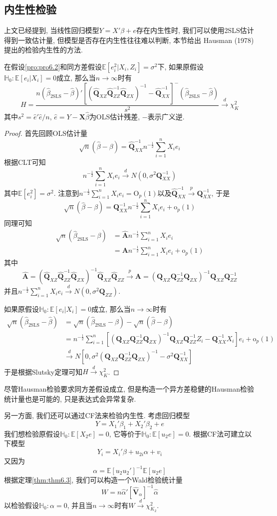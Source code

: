 \documentclass[cn, 12pt, math=mtpro2, bibstyle=apa, blue, twocol]{elegantbook}
\newcommand{\E}{\mathbb{E}}
\newcommand{\Q}{\mathbold{Q}}
\newcommand{\X}{\mathbold{X}}
\newcommand{\hb}{\hat{\beta}}
\newcommand{\HH}{\mathbb{H}}
\newcommand{\V}{\mathbold{V}}
\newcommand{\A}{\mathbold{A}}
\begin{document}
\subsection{内生性检验}
上文已经提到, 当线性回归模型$Y=X'\beta+e$存在内生性时, 我们可以使用2SLS估计得到一致估计量, 但模型是否存在内生性往往难以判断, 本节给出 Hausman (1978)提出的检验内生性的方法.
\begin{theorem}\label{thm:thm6.5}
  在假设\ref{pro:pro6.2}和同方差假设$\E[e_i^2|X_i,Z_i]=\sigma^2$下, 如果原假设$\HH_0: \E[e_i|X_i]=0$成立, 那么当$n\to\infty$时有
  $$H=\frac{n(\hb_{\text{2SLS}}-\hb)'[(\hat{\Q}_{XZ}\hat{\Q}_{ZZ}^{-1}\hat{\Q}_{ZX})^{-1}-\hat{\Q}_{XX}^{-1}]^{-}(\hb_{\text{2SLS}}-\hb)}{s^2}\xrightarrow{d}\chi^2_K$$
  其中$s^2=\hat{e}'\hat{e}/n$, $\hat{e}=Y-\X\hb$为OLS估计残差, $-$表示广义逆.
\end{theorem}
\begin{proof}
  首先回顾OLS估计量
  $$\sqrt{n}(\hb-\beta)=\hat{\Q}_{XX}^{-1}n^{-\frac{1}{2}}\sum_{i=1}^{n}X_ie_i$$
  根据CLT可知
  $$n^{-\frac{1}{2}}\sum_{i=1}^{n}X_ie_i\xrightarrow{d}N(0,\sigma^2\Q_{XX}^{-1})$$
  其中$\E[e_i^2]=\sigma^2$. 注意到$n^{-\frac{1}{2}}\sum_{i=1}^{n}X_ie_i=\text{O}_p(1)$以及$\hat{\Q}_{XX}^{-1}\xrightarrow{p}\Q_{XX}^{-1}$, 于是
  $$\sqrt{n}(\hb-\beta)=\Q_{XX}^{-1}n^{-\frac{1}{2}}\sum_{i=1}^{n}X_ie_i+\text{o}_p(1)$$
  同理可知
  \begin{align*}
  \sqrt{n}(\hb_{\text{2SLS}}-\beta)&=\hat{\A}n^{-\frac{1}{2}}\sum_{i=1}^{n}X_ie_i \\
  &=\A n^{-\frac{1}{2}}\sum_{i=1}^{n}X_ie_i+\text{o}_p(1)
  \end{align*}
  其中
  $$\hat{\A}=(\hat{\Q}_{XZ}\hat{\Q}_{ZZ}^{-1}\hat{\Q}_{ZX})^{-1}\hat{\Q}_{XZ}\hat{\Q}_{ZZ}\xrightarrow{p}\A=(\Q_{XZ}\Q_{ZZ}^{-1}\Q_{ZX})^{-1}\Q_{XZ}\Q_{ZZ}^{-1}$$
  并且$n^{-\frac{1}{2}}\sum_{i=1}^{n}X_ie_i\xrightarrow{d}N(0,\sigma^2\Q_{ZZ})$.

  如果原假设$\HH_0:\E[e_i|X_i]=0$成立, 那么当$n\to\infty$时有
  \begin{align*}
  \sqrt{n}(\hb_{\text{2SLS}}-\hb)&=\sqrt{n}(\hb_{\text{2SLS}}-\beta)-\sqrt{n}(\hb-\beta) \\
  &=n^{-\frac{1}{2}}\sum_{i=1}^{n}[(\Q_{XZ}\Q_{ZZ}^{-1}\Q_{ZX})^{-1}\Q_{XZ}\Q_{ZZ}^{-1}Z_i-\Q_{XX}^{-1}X_i]e_i+\text{o}_p(1) \\
  &\xrightarrow{d}N[0,\sigma^2(\Q_{XZ}\Q_{ZZ}^{-1}\Q_{ZX})^{-1}-\sigma^2\Q_{XX}^{-1}]
  \end{align*}
  于是根据Slutsky定理可知$H\xrightarrow{d}\chi_K^2$.
\end{proof}
\begin{remark}
尽管Hausman检验要求同方差假设成立, 但是构造一个异方差稳健的Hausman检验统计量也是可能的, 只是表达式会异常复杂.
\end{remark}
另一方面, 我们还可以通过CF法来检验内生性. 考虑回归模型
$$Y=X_1'\beta_1+X_2'\beta_2+e$$
我们想检验原假设$\HH_0: \E[X_2e]=0$, 它等价于$\HH_0:\E[u_2e]=0$. 根据CF法可建立以下模型
$$Y_i=X_i'\beta+\hat{u}_{2i}\alpha+v_i$$
又因为
$$\alpha=\E[u_2u_2']^{-1}\E[u_2e]$$
根据定理\ref{thm:thm6.3}, 我们可以构造一个Wald检验统计量
$$W=n\hat{\alpha}'[\hat{\V}_{\alpha}]^{-1}\hat{\alpha}$$
以检验假设$\HH_0:\alpha=0$, 并且当$n\to\infty$时有$W\xrightarrow{d}\chi^2_{K_2}$.
\end{document}
